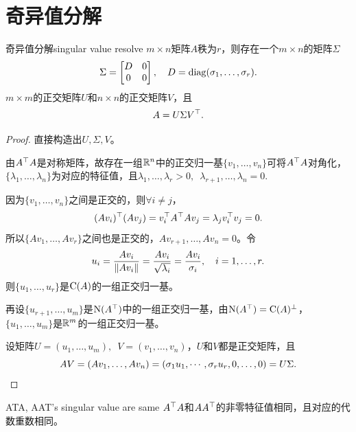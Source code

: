 \section{奇异值分解}
\begin{theorem}{奇异值分解}{singular value resolve}
	$m \times n$矩阵$A$秩为$r$，则存在一个$m \times n$的矩阵$\Sigma$
	\begin{equation}\label{eq:la-singular-value-matrix}
		\Sigma = \begin{bmatrix}
			D&0\\0&0
		\end{bmatrix},\quad D = \operatorname{diag}(\sigma_1,\ldots,\sigma_r).
	\end{equation}
	$m \times m$的正交矩阵$U$和$n \times n$的正交矩阵$V$，且
	\begin{equation}\label{eq:la-singular-value-decomposition}
		A = U\Sigma V^\top.
	\end{equation}
\end{theorem}
\begin{proof}
	直接构造出$U,\Sigma,V$。
	
	由$A^\top A$是对称矩阵，故存在一组$\mathbb{R}^n$中的正交归一基$\{v_1,\ldots,v_n\}$可将$A^\top A$对角化，$\{\lambda_1,\ldots,\lambda_n\}$为对应的特征值，且$\lambda_1,\ldots,\lambda_r > 0,\enspace\lambda_{r+1},\ldots,\lambda_n = 0.$
	
	因为$\{v_1,\ldots,v_n\}$之间是正交的，则$\forall i \neq j$，
	\[
		(Av_i)^\top(Av_j) = v_i^\top A^\top Av_j = \lambda_jv_i^\top v_j = 0.
	\]
	所以$\{Av_1,\ldots,Av_r\}$之间也是正交的，$Av_{r+1},\ldots,Av_n = 0$。令
	\begin{equation}\label{eq:la-left-singular-vectors}
		u_i = \frac{Av_i}{\lVert Av_i\rVert} = \frac{Av_i}{\sqrt{\lambda_i}} = \frac{Av_i}{\sigma_i},\quad i = 1,\ldots,r.
	\end{equation}
	则$\{u_1,\ldots,u_r\}$是$\operatorname{C}(A)$的一组正交归一基。
	
	再设$\{u_{r+1},\ldots,u_m\}$是$\operatorname{N}(A^\top)$中的一组正交归一基，由$\operatorname{N}(A^\top) = \operatorname{C}(A)^\perp$，$\{u_1,\ldots,u_m\}$是$\mathbb{R}^m$的一组正交归一基。
	
	设矩阵$U = (u_1,\ldots,u_m),\enspace V = (v_1,\ldots,v_n)$，$U$和$V$都是正交矩阵，且
	\[
		AV = (Av_1,\ldots,Av_n) = (\sigma_1u_1,\cdots,\sigma_ru_r,0,\ldots,0) = U\Sigma.
		\qedhere
	\]
\end{proof}
\begin{theorem}{}{ATA, AAT's singular value are same}
	$A^\top A$和$AA^\top$的非零特征值相同，且对应的代数重数相同。
\end{theorem}
